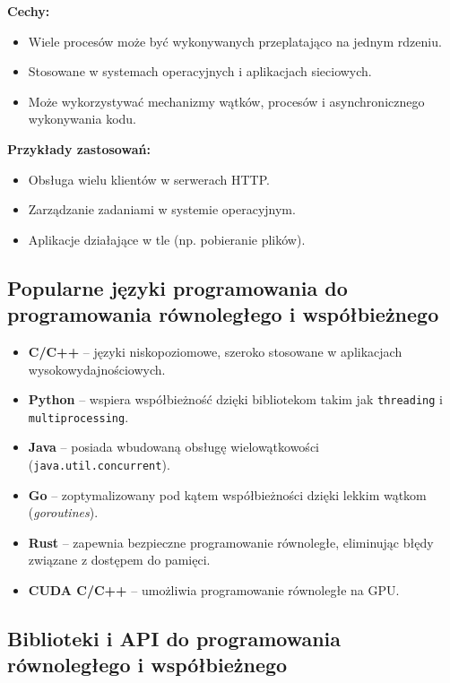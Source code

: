 \textbf{Cechy:}
\begin{itemize}
    \item Wiele procesów może być wykonywanych przeplatająco na jednym rdzeniu.
    \item Stosowane w systemach operacyjnych i aplikacjach sieciowych.
    \item Może wykorzystywać mechanizmy wątków, procesów i asynchronicznego wykonywania kodu.
\end{itemize}

\textbf{Przykłady zastosowań:}
\begin{itemize}
    \item Obsługa wielu klientów w serwerach HTTP.
    \item Zarządzanie zadaniami w systemie operacyjnym.
    \item Aplikacje działające w tle (np. pobieranie plików).
\end{itemize}

\subsection{Popularne języki programowania do programowania równoległego i współbieżnego}

\begin{itemize}
    \item \textbf{C/C++} – języki niskopoziomowe, szeroko stosowane w aplikacjach wysokowydajnościowych.
    \item \textbf{Python} – wspiera współbieżność dzięki bibliotekom takim jak \texttt{threading} i \texttt{multiprocessing}.
    \item \textbf{Java} – posiada wbudowaną obsługę wielowątkowości (\texttt{java.util.concurrent}).
    \item \textbf{Go} – zoptymalizowany pod kątem współbieżności dzięki lekkim wątkom (\textit{goroutines}).
    \item \textbf{Rust} – zapewnia bezpieczne programowanie równoległe, eliminując błędy związane z dostępem do pamięci.
    \item \textbf{CUDA C/C++} – umożliwia programowanie równoległe na GPU.
\end{itemize}

\subsection{Biblioteki i API do programowania równoległego i współbieżnego}

